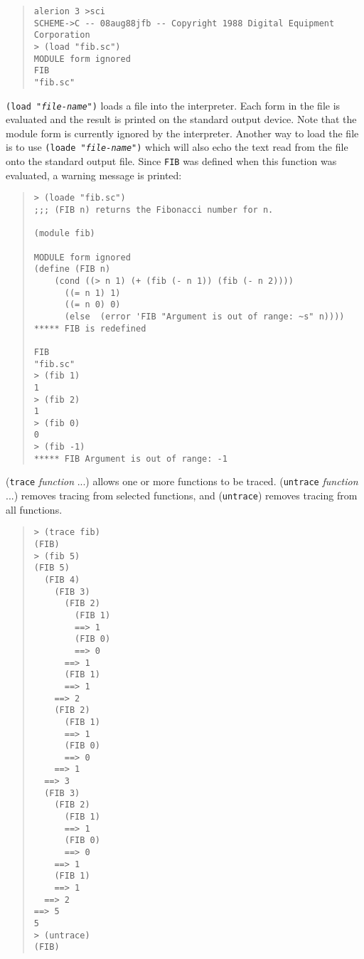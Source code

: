 \documentclass[11pt]{article}
\begin{document}
\begin{small}
\begin{quote}
\begin{verbatim}
alerion 3 >sci
SCHEME->C -- 08aug88jfb -- Copyright 1988 Digital Equipment Corporation
> (load "fib.sc")
MODULE form ignored
FIB
"fib.sc"
\end{verbatim}
\end{quote}
\end{small}

\texttt{(load "\textnormal{\emph{file-name}}")} loads a file into the
interpreter.  Each
form in the file is evaluated and the result is printed on the
standard output device.  Note that the module form is currently
ignored by the interpreter.  Another way to load the file is to use
\texttt{(loade "\textnormal{\emph{file-name}}")} which will also echo the text read from
the file onto the standard output file.  Since \texttt{FIB} was defined
when this function was evaluated, a warning message is printed:

\begin{small}
\begin{quote}
\begin{verbatim}
> (loade "fib.sc")
;;; (FIB n) returns the Fibonacci number for n.

(module fib)

MODULE form ignored
(define (FIB n)
    (cond ((> n 1) (+ (fib (- n 1)) (fib (- n 2))))
	  ((= n 1) 1)
	  ((= n 0) 0)
	  (else  (error 'FIB "Argument is out of range: ~s" n))))
***** FIB is redefined

FIB
"fib.sc"
> (fib 1)
1
> (fib 2)
1
> (fib 0)
0
> (fib -1)
***** FIB Argument is out of range: -1
\end{verbatim}
\end{quote}
\end{small}

(\texttt{trace} \emph{function} ...) allows one or more functions to be
traced. (\texttt{untrace} \emph{function} ...) removes tracing from selected
functions, and (\texttt{untrace}) removes tracing from all functions.

\begin{small}
\begin{quote}
\begin{verbatim}
> (trace fib)
(FIB)
> (fib 5)
(FIB 5)
  (FIB 4)
    (FIB 3)
      (FIB 2)
        (FIB 1)
        ==> 1
        (FIB 0)
        ==> 0
      ==> 1
      (FIB 1)
      ==> 1
    ==> 2
    (FIB 2)
      (FIB 1)
      ==> 1
      (FIB 0)
      ==> 0
    ==> 1
  ==> 3
  (FIB 3)
    (FIB 2)
      (FIB 1)
      ==> 1
      (FIB 0)
      ==> 0
    ==> 1
    (FIB 1)
    ==> 1
  ==> 2
==> 5
5
> (untrace)
(FIB)
\end{verbatim}
\end{quote}
\end{small}
\end{document}
